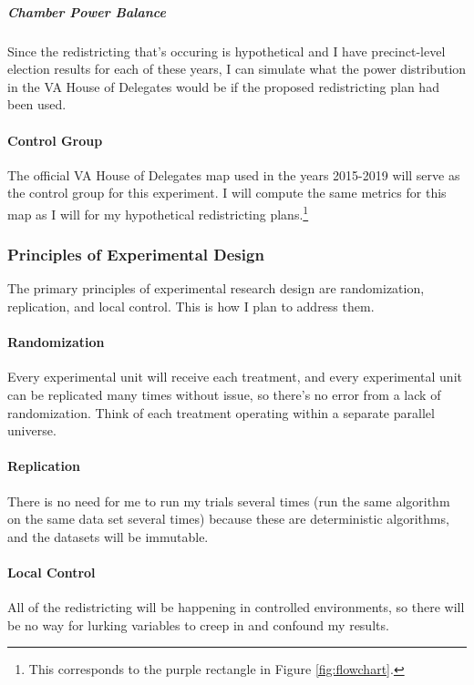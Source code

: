 \subparagraph{Chamber Power Balance}

Since the redistricting that's occuring is hypothetical and I have precinct-level election results for each of these years, I can simulate what the power distribution in the VA House of Delegates would be if the proposed redistricting plan had been used. 

\paragraph{Control Group}

The official VA House of Delegates map used in the years 2015-2019 will serve as the control group for this experiment. I will compute the same metrics for this map as I will for my hypothetical redistricting plans.\footnote{This corresponds to the purple rectangle in Figure \ref{fig:flowchart}.}

\subsubsection{Principles of Experimental Design}

The primary principles of experimental research design are randomization, replication, and local control. This is how I plan to address them. 

\paragraph{Randomization}

Every experimental unit will receive each treatment, and every experimental unit can be replicated many times without issue, so there’s no error from a lack of randomization. Think of each treatment operating within a separate parallel universe. 

\paragraph{Replication}

There is no need for me to run my trials several times (run the same algorithm on the same data set several times) because these are deterministic algorithms, and the datasets will be immutable. 

\paragraph{Local Control}

All of the redistricting will be happening in controlled environments, so there will be no way for lurking variables to creep in and confound my results. 

